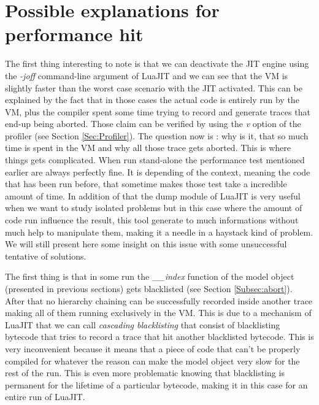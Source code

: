 
\section{Possible explanations for performance hit}
\label{Sec:MO-insta}

The first thing interesting to note is that we can deactivate the JIT engine using
the \emph{-joff} command-line argument of LuaJIT and we can see that the VM is
slightly faster than the worst case scenario with the JIT activated. This can
be explained by the fact that in those cases the actual code is entirely run by
the VM, plus the compiler spent some time trying to record and generate traces
that end-up being aborted. Those claim can be verified by using the \emph{v}
option of the profiler (see Section \ref{Sec:Profiler}). The question now is :
why is it, that so much time is spent in the VM and why all those trace gets
aborted. This is where things gets complicated. When run stand-alone the
performance test mentioned earlier are always perfectly fine. It is depending of
the context, meaning the code that has been run before, that sometime makes those
test take a incredible amount of time. In addition of that the dump module of
LuaJIT is very useful when we want to study isolated problems but in this case
where the amount of code run influence the result, this tool generate to much
informations without much help to manipulate them, making it a needle in a
haystack kind of problem.\\

We will still present here some insight on this issue with some unsuccessful
tentative of solutions.

The first thing is that in some run the \emph{\_\_index}
function of the model object (presented in previous sections) gets blacklisted
(see Section \ref{Subsec:abort}). After that no hierarchy chaining can be
successfully recorded inside another trace making all of them running
exclusively in the VM. This is due to a mechanism of LuaJIT that we can call
\emph{cascading blacklisting} that consist of blacklisting bytecode that tries to
record a trace that hit another blacklisted bytecode. This is very inconvenient
because it means that a piece of code that can't be properly compiled for
whatever the reason can make the model object very slow for the rest of the run.
This is even more problematic knowing that blacklisting is permanent for the
lifetime of a particular bytecode, making it in this case for an entire run of
LuaJIT.

